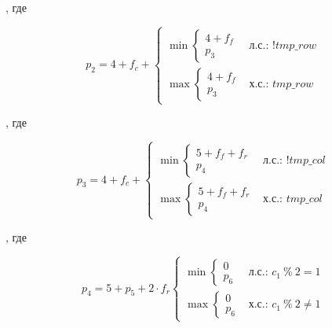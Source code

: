 \begin{enumerate}
    , где

    \begin{equation*}
        p_2 =
        4 + f_c +
        \begin{cases}
            \min
            \begin{cases}
                4 + f_f \\
                p_3
            \end{cases} & \textit{л.с.: $!tmp\_row$} \\
            \max
            \begin{cases}
                4 + f_f \\
                p_3
            \end{cases} & \textit{х.с.: $tmp\_row$}
        \end{cases}
    \end{equation*}

    , где

    \begin{equation*}
        p_3 =
        4 + f_c +
        \begin{cases}
            \min
            \begin{cases}
                5 + f_f + f_r \\
                p_4
            \end{cases} & \textit{л.с.: $!tmp\_col$} \\
            \max
            \begin{cases}
                5 + f_f + f_r \\
                p_4
            \end{cases} & \textit{х.с.: $tmp\_col$}
        \end{cases}
    \end{equation*}

    , где

    \begin{equation*}
        p_4 =
        5 + p_5 + 2 \cdot f_r
        \begin{cases}
            \min
            \begin{cases}
                0 \\
                p_6
            \end{cases} & \textit{л.с.: $c_1~\%~2 = 1$} \\
            \max
            \begin{cases}
                0 \\
                p_6
            \end{cases} & \textit{х.с.: $c_1~\%~2 \ne 1$}
        \end{cases}
    \end{equation*}


\end{enumerate}
